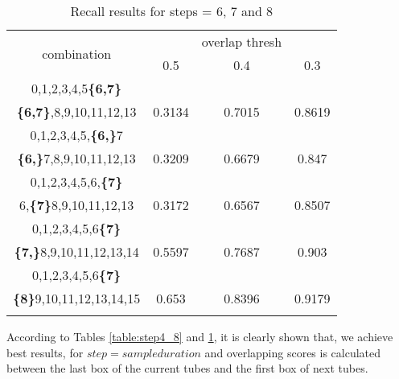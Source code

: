 \begin{center}
\begin{longtable}{||c||c c c||}

  \hline
  \multirow{2}{5em}{combination} & {} &overlap thresh & {} \\
                                    &   0.5  &  0.4 &  0.3 \\         
  \hline  \hline
  0,1,2,3,4,5\textbf{\{6,7\}}           & {} & {} & {} \\
  \textbf{\{6,7\}},8,9,10,11,12,13      & 0.3134  & 0.7015 & 0.8619 \\
  \hline     \hline                          

  0,1,2,3,4,5,\textbf{\{6,\}}7          & {} & {} & {} \\
  \textbf{\{6,\}}7,8,9,10,11,12,13      & 0.3209  & 0.6679 & 0.847 \\
  \hline                          
  0,1,2,3,4,5,6,\textbf{\{7\}}          & {} & {} & {} \\
  6,\textbf{\{7\}}8,9,10,11,12,13       & 0.3172  & 0.6567 & 0.8507 \\
  \hline                          
  0,1,2,3,4,5,6\textbf{\{7\}}           & {} & {} & {} \\
  \textbf{\{7,\}}8,9,10,11,12,13,14     & 0.5597  & 0.7687 & 0.903 \\
  \hline                           
  0,1,2,3,4,5,6\textbf{\{7\}}           & {} & {} & {} \\
  \textbf{\{8\}}9,10,11,12,13,14,15     & 0.653	  & 0.8396 &0.9179  \\
  \hline                           
  \caption{Recall results for steps = 6, 7 and 8}
  \label{table:step8_678 }
\end{longtable} 
\end{center}

According to Tables \ref{table:step4_8} and \ref{table:step8_678 }, it is clearly shown that, we achieve best results, for $step = sample duration$ and overlapping scores is calculated between the last box of the current tubes and the first box of next tubes.

